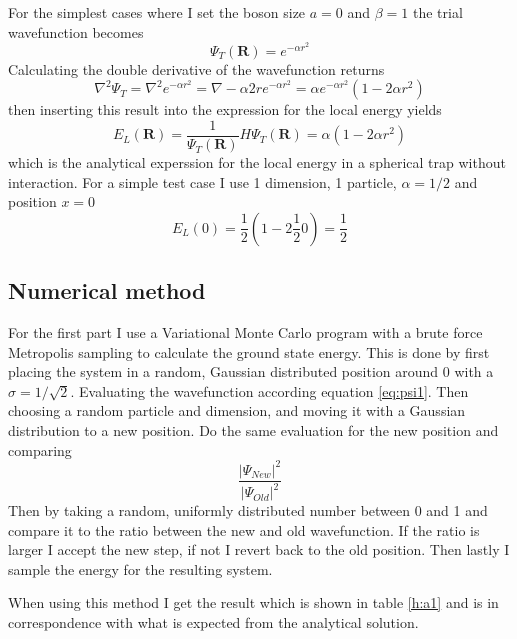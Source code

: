 \documentclass[12pt]{article}
\begin{document}
  For the simplest cases where I set the boson size $a = 0$ and $\beta = 1$ the 
  trial wavefunction becomes 
  \begin{equation}
    \Psi_T(\bm{R}) = e^{-\alpha r^2}
    \label{eq:psi1}
  \end{equation}
  Calculating the double derivative of the wavefunction returns
  \begin{equation}
    \nabla^2\Psi_T = \nabla^2 e^{-\alpha r^2} = \nabla -\alpha 2r e^{-\alpha r^2}%
    = \alpha e^{-\alpha r^2}(1 - 2\alpha r^2)
  \end{equation}
  then inserting this result into the expression for the local energy yields
  \begin{equation}
    E_L(\bm{R}) = \frac{1}{\Psi_T(\bm{R})}H\Psi_T(\bm{R}) = \alpha(1-2\alpha r^2)
  \end{equation}
  which is the analytical experssion for the local energy in a spherical trap 
  without interaction.
  For a simple test case I use 1 dimension, 1 particle, $\alpha = 1/2$ and position $x=0$ 
  \[E_L (0) = \frac{1}{2}(1-2\frac{1}{2}0) = \frac{1}{2}\]
  \subsection{Numerical method}
  For the first part I use a Variational Monte Carlo program with a brute force Metropolis
  sampling to calculate the ground state energy. This is done by first placing the system in
  a random, Gaussian distributed position around 0 with a $\sigma = 1/\sqrt{2}$. Evaluating the
  wavefunction according equation \ref{eq:psi1}. Then choosing a random particle and dimension,
  and moving it with a Gaussian distribution to a new position. Do the same evaluation for
  the new position and comparing
  \[\frac{|\Psi_{New}|^2}{|\Psi_{Old}|^2}\]
  Then by taking a random, uniformly distributed number between 0 and 1 and compare it
  to the ratio between the new and old wavefunction. If the ratio is larger I accept
  the new step, if not I revert back to the old position. Then lastly I sample the energy for
  the resulting system.
  
  When using this method I get the result which is shown in table \ref{h:a1} and is
  in correspondence with what is expected from the analytical solution.
  
  \newpage
  \appendix
  
\end{document}

